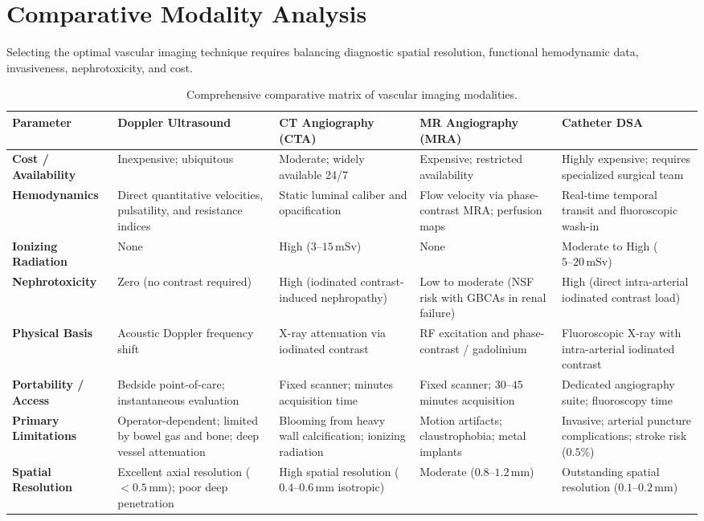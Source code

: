 \documentclass[11pt,a4paper]{article}
\begin{document}
\section{Comparative Modality Analysis}

Selecting the optimal vascular imaging technique requires balancing diagnostic spatial resolution, functional hemodynamic data, invasiveness, nephrotoxicity, and cost.

\begin{table}[htbp]
\centering
\small
\setlength{\tabcolsep}{3pt}
\begin{tabular}{p{2.8cm}p{2.7cm}p{2.85cm}p{2.75cm}p{2.8cm}}
\toprule
\textbf{Parameter} & \textbf{Doppler Ultrasound} & \textbf{CT Angiography (CTA)} & \textbf{MR Angiography (MRA)} & \textbf{Catheter DSA} \\
\midrule
\textbf{Cost / Availability} & Inexpensive; ubiquitous & Moderate; widely available 24/7 & Expensive; restricted availability & Highly expensive; requires specialized surgical team \\
\addlinespace
\textbf{Hemodynamics} & Direct quantitative velocities, pulsatility, and resistance indices & Static luminal caliber and opacification & Flow velocity via phase-contrast MRA; perfusion maps & Real-time temporal transit and fluoroscopic wash-in \\
\addlinespace
\textbf{Ionizing Radiation} & None & High ($3\text{--}15\,\text{mSv}$) & None & Moderate to High ($5\text{--}20\,\text{mSv}$) \\
\addlinespace
\textbf{Nephrotoxicity} & Zero (no contrast required) & High (iodinated contrast-induced nephropathy) & Low to moderate (NSF risk with GBCAs in renal failure) & High (direct intra-arterial iodinated contrast load) \\
\addlinespace
\textbf{Physical Basis} & Acoustic Doppler frequency shift & X-ray attenuation via iodinated contrast & RF excitation and phase-contrast / gadolinium & Fluoroscopic X-ray with intra-arterial iodinated contrast \\
\addlinespace
\textbf{Portability / Access} & Bedside point-of-care; instantaneous evaluation & Fixed scanner; minutes acquisition time & Fixed scanner; $30\text{--}45$ minutes acquisition & Dedicated angiography suite; fluoroscopy time \\
\addlinespace
\textbf{Primary Limitations} & Operator-dependent; limited by bowel gas and bone; deep vessel attenuation & Blooming from heavy wall calcification; ionizing radiation & Motion artifacts; claustrophobia; metal implants & Invasive; arterial puncture complications; stroke risk ($0.5\%$) \\
\addlinespace
\textbf{Spatial Resolution} & Excellent axial resolution ($< 0.5\,\text{mm}$); poor deep penetration & High spatial resolution ($0.4\text{--}0.6\,\text{mm}$ isotropic) & Moderate ($0.8\text{--}1.2\,\text{mm}$) & Outstanding spatial resolution ($0.1\text{--}0.2\,\text{mm}$) \\
\bottomrule
\end{tabular}
\caption{Comprehensive comparative matrix of vascular imaging modalities.}
\label{tab:modality_comparison}
\end{table}
\end{document}
